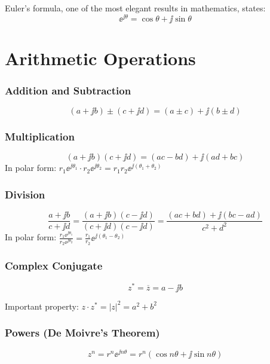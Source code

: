 Euler's formula, one of the most elegant results in mathematics, states:
\begin{equation}
\boxed{\ee^{\jj\theta} = \cos\theta + \jj\sin\theta}
\end{equation}



\section{Arithmetic Operations}

\subsubsection{Addition and Subtraction}
\begin{equation}
(a + \jj b) \pm (c + \jj d) = (a \pm c) + \jj(b \pm d)
\end{equation}

\subsubsection{Multiplication}
\begin{equation}
(a + \jj b)(c + \jj d) = (ac - bd) + \jj(ad + bc)
\end{equation}
In polar form: $r_1 \ee^{\jj\theta_1} \cdot r_2 \ee^{\jj\theta_2} = r_1 r_2 \ee^{\jj(\theta_1 + \theta_2)}$

\subsubsection{Division}
\begin{equation}
\frac{a + \jj b}{c + \jj d} = \frac{(a + \jj b)(c - \jj d)}{(c + \jj d)(c - \jj d)} = \frac{(ac + bd) + \jj(bc - ad)}{c^2 + d^2}
\end{equation}
In polar form: $\frac{r_1 \ee^{\jj\theta_1}}{r_2 \ee^{\jj\theta_2}} = \frac{r_1}{r_2} \ee^{\jj(\theta_1 - \theta_2)}$

\subsubsection{Complex Conjugate}
\begin{equation}
z^* = \overline{z} = a - \jj b
\end{equation}

Important property: $z \cdot z^* = |z|^2 = a^2 + b^2$

\subsubsection{Powers (De Moivre's Theorem)}
\begin{equation}
z^n = r^n \ee^{\jj n\theta} = r^n(\cos n\theta + \jj\sin n\theta)
\end{equation}


